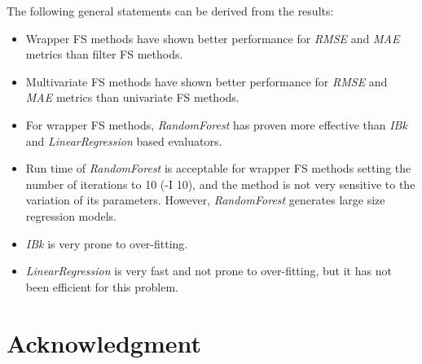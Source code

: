 \documentclass[journal,twoside,web]{ieeecolor}
\begin{document}
The following general statements can be derived from the results:

\begin{itemize}
	\item Wrapper FS methods have shown better performance for \textit{RMSE} and \textit{MAE} metrics than filter FS methods.
	\item Multivariate FS methods have shown better performance for \textit{RMSE} and \textit{MAE} metrics than univariate FS methods.
	\item For wrapper FS methods, \textit{RandomForest} has proven more effective than \textit{IBk} and \textit{LinearRegression} based evaluators. 
	\item Run time of \textit{RandomForest} is acceptable for wrapper FS methods setting the number of iterations to 10 (-I 10), and the method is not very sensitive to the variation of its parameters. However, \textit{RandomForest} generates large size regression models.
	\item \textit{IBk}  is very prone to over-fitting.
	
	\item \textit{LinearRegression} is very fast and not prone to over-fitting, but it has not been efficient for this problem.
	
\end{itemize}



\section*{Acknowledgment}




 

\end{document}

